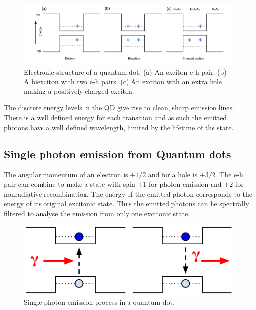 \begin{figure}[h!] \begin{center}
\includegraphics[width=1\textwidth]{images/estructure.pdf} \end{center}
\caption{Electronic structure of a quantum dot. (a) An exciton e-h pair. (b) A
biexciton with two e-h pairs. (c) An exciton with an extra hole making a
positively charged exciton.} \label{fig:estructure} \end{figure}

The discrete energy levels in the QD give rise to clean, sharp emission lines.
There is a well defined energy for each transition and as such the emitted
photons have a well defined wavelength, limited by the lifetime of the state.

\subsection{Single photon emission from Quantum dots }

The angular momentum of an electron is $\pm 1/2$ and for a hole is $\pm 3/2$.
The e-h pair can combine to make a state with spin $\pm 1$ for photon emission
and $\pm 2$ for nonradiative recombination. The energy of the emitted photon
corresponds to the energy of its original excitonic state. Thus the emitted
photons can be spectrally filtered to analyse the emission from only one
excitonic state.

\begin{figure}[h!] \begin{center}
\includegraphics[width=1\textwidth]{images/qd_photon.pdf} \end{center}
\caption{Single photon emission process in a quantum dot.} \label{fig:qd_photon}
\end{figure}

